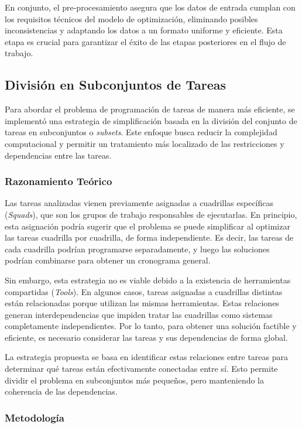 \documentclass{article}
\begin{document}
En conjunto, el pre-procesamiento asegura que los datos de entrada cumplan con los requisitos técnicos del modelo de optimización, eliminando posibles inconsistencias y adaptando los datos a un formato uniforme y eficiente. Esta etapa es crucial para garantizar el éxito de las etapas posteriores en el flujo de trabajo.


\subsection{División en Subconjuntos de Tareas}

Para abordar el problema de programación de tareas de manera más eficiente, se implementó una estrategia de simplificación basada en la división del conjunto de tareas en subconjuntos o \textit{subsets}. Este enfoque busca reducir la complejidad computacional y permitir un tratamiento más localizado de las restricciones y dependencias entre las tareas.

\subsubsection{Razonamiento Teórico}

Las tareas analizadas vienen previamente asignadas a cuadrillas específicas (\textit{Squads}), que son los grupos de trabajo responsables de ejecutarlas. En principio, esta asignación podría sugerir que el problema se puede simplificar al optimizar las tareas cuadrilla por cuadrilla, de forma independiente. Es decir, las tareas de cada cuadrilla podrían programarse separadamente, y luego las soluciones podrían combinarse para obtener un cronograma general.

Sin embargo, esta estrategia no es viable debido a la existencia de herramientas compartidas (\textit{Tools}). En algunos casos, tareas asignadas a cuadrillas distintas están relacionadas porque utilizan las mismas herramientas. Estas relaciones generan interdependencias que impiden tratar las cuadrillas como sistemas completamente independientes. Por lo tanto, para obtener una solución factible y eficiente, es necesario considerar las tareas y sus dependencias de forma global.

La estrategia propuesta se basa en identificar estas relaciones entre tareas para determinar qué tareas están efectivamente conectadas entre sí. Esto permite dividir el problema en subconjuntos más pequeños, pero manteniendo la coherencia de las dependencias.

\subsubsection{Metodología}
\end{document}
